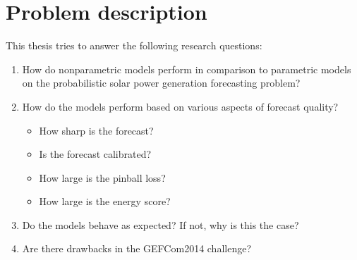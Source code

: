 \section{Problem description}
\label{sec:problem-description}

This thesis tries to answer the following research questions:
\begin{enumerate}
    \item How do nonparametric models perform in comparison to parametric models 
    on the probabilistic solar power generation forecasting problem?
    \item How do the models perform based on various aspects of forecast 
    quality?
    \begin{itemize}
        \item How sharp is the forecast?
        \item Is the forecast calibrated?
        \item How large is the pinball loss?
        \item How large is the energy score?
    \end{itemize}
    \item Do the models behave as expected? If not, why is this the case?
    \item Are there drawbacks in the GEFCom2014 challenge?
\end{enumerate}